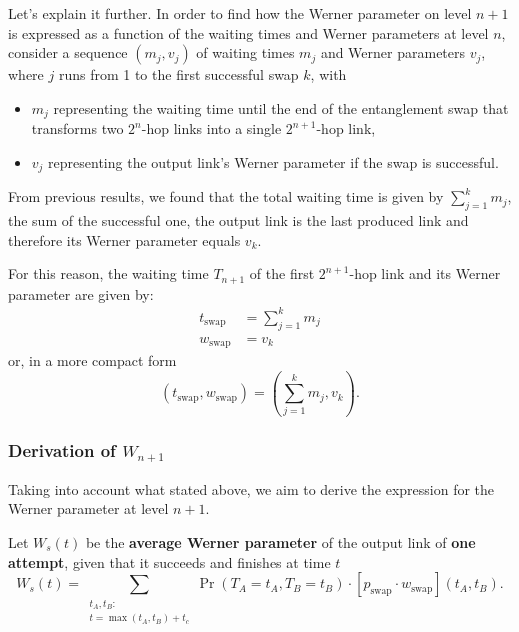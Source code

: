 \documentclass{masterthesis}
\begin{document}
Let's explain it further.
In order to find how the Werner parameter on level $n+1$ is expressed as a function of the waiting times and Werner parameters at level $n$, consider a sequence $\left(m_{j}, v_{j}\right)$ of waiting times $m_{j}$ and Werner parameters $v_{j}$, where $j$ runs from 1 to the first successful swap $k$, with
\begin{itemize}
    \item $m_{j}$ representing the waiting time until the end of the entanglement swap that transforms two $2^{n}$-hop links into a single $2^{n+1}$-hop link,
    \item $v_{j}$ representing the output link's Werner parameter if the swap is successful. 
\end{itemize}

From previous results, we found that the total waiting time is given by $\sum_{j=1}^{k} m_{j}$, the sum of the successful one, the output link is the last produced link and therefore its Werner parameter equals $v_{k}$. 

For this reason, the waiting time $T_{n+1}$ of the first $2^{n+1}$-hop link and its Werner parameter are given by:
\begin{align}
    t_\text{swap} &= \sum_{j=1}^{k} m_{j} \\ 
    w_\text{swap} &= v_k 
\end{align}
or, in a more compact form
\begin{equation}
    \left(t_\text{swap}, w_\text{swap}\right) = \left(\sum_{j=1}^{k} m_{j}, v_{k}\right) .
\end{equation}

\subsubsection*{Derivation of $W_{n+1}$}

Taking into account what stated above, we aim to derive the expression for the Werner parameter at level $n+1$. %

Let $W_{s}(t)$ be the \textbf{average Werner parameter} of the output link of \textbf{one attempt}, given that it succeeds and finishes at time $t$
\begin{equation}
    W_s(t) = \sum_{\substack{t_A, t_B:\\ t = \max(t_A, t_B) + t_c}} \Pr(T_A = t_A, T_B = t_B) \cdot [p_\text{swap} \cdot w_\text{swap}](t_A, t_B) .
\end{equation}
\end{document}
